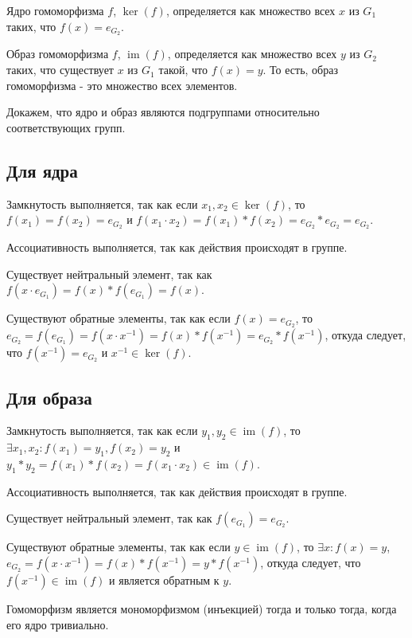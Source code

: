 \documentclass[12pt]{article}
\begin{document}
    Ядро гомоморфизма $f$, $\operatorname{ker}(f)$, определяется как множество всех $x$ из $G_1$ таких, что $f(x)=e_{G_2}$.

    Образ гомоморфизма $f$, $\operatorname{im}(f)$, определяется как множество всех $y$ из $G_2$ таких, что существует $x$ из $G_1$ такой, что $f(x)=y$. То есть, образ гомоморфизма - это множество всех элементов.

    Докажем, что ядро и образ являются подгруппами относительно соответствующих групп.

    \subsection{Для ядра}

    Замкнутость выполняется, так как если $x_1,x_2\in \operatorname{ker}(f)$, то \\ $f(x_1)=f(x_2)=e_{G_2}$ и $f(x_1\cdot x_2)=f(x_1)*f(x_2)=e_{G_2}*e_{G_2}=e_{G_2}$.

    Ассоциативность выполняется, так как действия происходят в группе.

    Существует нейтральный элемент, так как $f(x\cdot e_{G_1})=f(x)*f(e_{G_1})=f(x)$.

    Существуют обратные элементы, так как если $f(x)=e_{G_2}$, то $e_{G_2}=f(e_{G_1})=f(x\cdot x^{-1})=f(x)*f(x^{-1})=e_{G_2}*f(x^{-1})$, откуда следует, что $f(x^{-1})=e_{G_2}$ и $x^{-1}\in \operatorname{ker}(f)$.

    \subsection{Для образа}

    Замкнутость выполняется, так как если $y_1,y_2\in \operatorname{im}(f)$, то \\$\exists x_1,x_2:f(x_1)=y_1,f(x_2)=y_2$ и $y_1*y_2=f(x_1)*f(x_2)=f(x_1\cdot x_2)\in \operatorname{im}(f)$.

Ассоциативность выполняется, так как действия происходят в группе.

Существует нейтральный элемент, так как $f(e_{G_1})=e_{G_2}$.

Существуют обратные элементы, так как если $y\in \operatorname{im}(f)$, то $\exists x:f(x)=y$, $e_{G_2}=f(x\cdot x^{-1})=f(x)*f(x^{-1})=y*f(x^{-1})$, откуда следует, что $f(x^{-1})\in \operatorname{im}(f)$ и является обратным к $y$.

Гомоморфизм является мономорфизмом (инъекцией) тогда и только тогда, когда его ядро тривиально.
\end{document}
